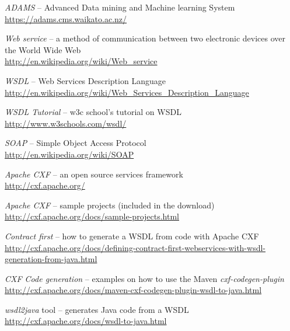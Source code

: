 %

\begin{thebibliography}{999}

		\textit{ADAMS} -- Advanced Data mining and Machine learning System \\
		{\scriptsize \url{https://adams.cms.waikato.ac.nz/}{}}
		
		\textit{Web service} -- a method of communication between two electronic 
		devices over the World Wide Web \\
		{\scriptsize \url{http://en.wikipedia.org/wiki/Web_service}{}}
		
		\textit{WSDL} -- Web Services Description Language \\
		{\scriptsize \url{http://en.wikipedia.org/wiki/Web_Services_Description_Language}{}}

		\textit{WSDL Tutorial} -- w3c school's tutorial on WSDL \\
		{\scriptsize \url{http://www.w3schools.com/wsdl/}{}}
		
		\textit{SOAP} -- Simple Object Access Protocol \\
		\url{http://en.wikipedia.org/wiki/SOAP}{}
		
		\textit{Apache CXF} -- an open source services framework \\
		{\scriptsize \url{http://cxf.apache.org/}{}}
		
		\textit{Apache CXF} -- sample projects (included in the download) \\
		{\scriptsize \url{http://cxf.apache.org/docs/sample-projects.html}{}}
		
		\textit{Contract first} -- how to generate a WSDL from code with Apache CXF \\
		{\scriptsize \url{http://cxf.apache.org/docs/defining-contract-first-webservices-with-wsdl-generation-from-java.html}{}}
		
		\textit{CXF Code generation} -- examples on how to use the Maven \textit{cxf-codegen-plugin} \\
		{\scriptsize \url{http://cxf.apache.org/docs/maven-cxf-codegen-plugin-wsdl-to-java.html}{}}
	
		\textit{wsdl2java} tool -- generates Java code from a WSDL \\
		{\scriptsize \url{http://cxf.apache.org/docs/wsdl-to-java.html}{}}

\end{thebibliography}

